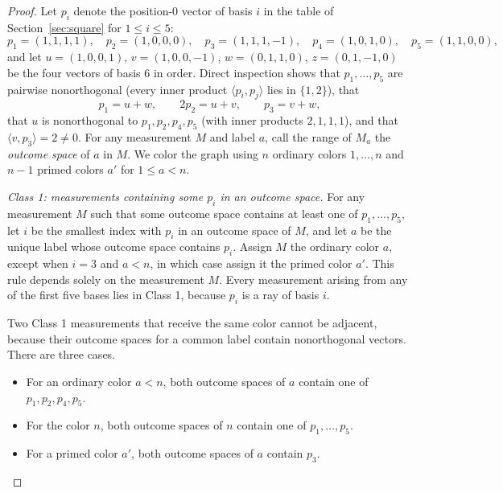 \begin{proof}
Let $p_i$ denote the position-$0$ vector of basis $i$ in the table of Section~\ref{sec:square} for $1\le i\le5$:
\[
 p_1=(1,1,1,1),\quad p_2=(1,0,0,0),\quad p_3=(1,1,1,-1),\quad p_4=(1,0,1,0),\quad p_5=(1,1,0,0),
\]
and let $u=(1,0,0,1)$, $v=(1,0,0,-1)$, $w=(0,1,1,0)$, $z=(0,1,-1,0)$ be the four vectors of basis $6$ in order. Direct inspection shows that $p_1,\ldots,p_5$ are pairwise nonorthogonal (every inner product $\langle p_i,p_j\rangle$ lies in $\{1,2\}$), that
\[
 p_1=u+w,\qquad 2p_2=u+v,\qquad p_3=v+w,
\]
that $u$ is nonorthogonal to $p_1,p_2,p_4,p_5$ (with inner products $2,1,1,1$), and that $\langle v,p_3\rangle=2\ne0$. For any measurement $M$ and label $a$, call the range of $M_a$ the \emph{outcome space} of $a$ in $M$. We color the graph using $n$ ordinary colors $1,\ldots,n$ and $n-1$ primed colors $a'$ for $1\le a<n$.

\emph{Class 1: measurements containing some $p_i$ in an outcome space.} For any measurement $M$ such that some outcome space contains at least one of $p_1,\ldots,p_5$, let $i$ be the smallest index with $p_i$ in an outcome space of $M$, and let $a$ be the unique label whose outcome space contains $p_i$. Assign $M$ the ordinary color $a$, except when $i=3$ and $a<n$, in which case assign it the primed color $a'$. This rule depends solely on the measurement $M$. Every measurement arising from any of the first five bases lies in Class 1, because $p_i$ is a ray of basis $i$.

Two Class 1 measurements that receive the same color cannot be adjacent, because their outcome spaces for a common label contain nonorthogonal vectors. There are three cases.
\begin{itemize}
\item For an ordinary color $a<n$, both outcome spaces of $a$ contain one of $p_1,p_2,p_4,p_5$.
\item For the color $n$, both outcome spaces of $n$ contain one of $p_1,\ldots,p_5$.
\item For a primed color $a'$, both outcome spaces of $a$ contain $p_3$.
\end{itemize}


\end{proof}
